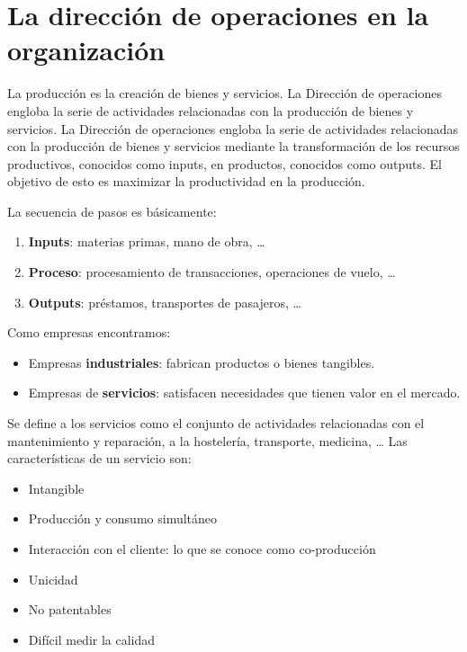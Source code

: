 \documentclass[12pt]{report} %
\providecommand{\tightlist}{%
  \setlength{\itemsep}{0pt}\setlength{\parskip}{0pt}}
\begin{document}
\hypertarget{la-direcciuxf3n-de-operaciones-en-la-organizaciuxf3n}{%
\section{La dirección de operaciones en la
organización}\label{la-direcciuxf3n-de-operaciones-en-la-organizaciuxf3n}}

La producción es la creación de bienes y servicios. La Dirección de
operaciones engloba la serie de actividades relacionadas con la
producción de bienes y servicios. La Dirección de operaciones engloba la
serie de actividades relacionadas con la producción de bienes y
servicios mediante la transformación de los recursos productivos,
conocidos como inputs, en productos, conocidos como outputs. El objetivo
de esto es maximizar la productividad en la producción.

La secuencia de pasos es básicamente:

\begin{enumerate}
\def\labelenumi{\arabic{enumi}.}
\tightlist
\item
  \textbf{Inputs}: materias primas, mano de obra, \ldots{}\\
\item
  \textbf{Proceso}: procesamiento de transacciones, operaciones de
  vuelo, \ldots{}\\
\item
  \textbf{Outputs}: préstamos, transportes de pasajeros, \ldots{}
\end{enumerate}

Como empresas encontramos:

\begin{itemize}
\tightlist
\item
  Empresas \textbf{industriales}: fabrican productos o bienes
  tangibles.\\
\item
  Empresas de \textbf{servicios}: satisfacen necesidades que tienen
  valor en el mercado.
\end{itemize}

Se define a los servicios como el conjunto de actividades relacionadas
con el mantenimiento y reparación, a la hostelería, transporte,
medicina, \ldots{} Las características de un servicio son:

\begin{itemize}
\tightlist
\item
  Intangible\\
\item
  Producción y consumo simultáneo\\
\item
  Interacción con el cliente: lo que se conoce como co-producción\\
\item
  Unicidad\\
\item
  No patentables\\
\item
  Difícil medir la calidad
\end{itemize}
\end{document}
